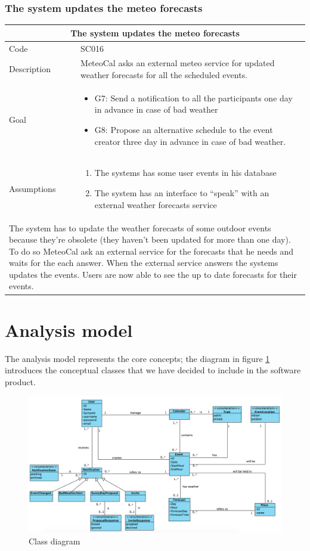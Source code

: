 \documentclass[10pt,a4paper,titlepage]{article}
\begin{document}
\subsubsection{The system updates the meteo forecasts}
\begin{tabular}{| p{3cm} | p{10cm} |}
\hline \multicolumn{2}{|c|}{\textbf{The system updates the meteo forecasts}} \\ 
\hline Code & SC016 \\ 
\hline Description & MeteoCal asks an external meteo service for updated weather forecasts for all the scheduled events. \\
\hline Goal & \begin{itemize}
\item G7: Send a notification to all the participants one day in advance in case of bad weather
\item G8: Propose an alternative schedule to the event creator three day in advance in case of bad weather.
\end{itemize}\\
\hline Assumptions  & \begin{enumerate}
\item The systems has some user events in his database
\item The system has an interface to “speak” with an external weather forecasts service
\end{enumerate} \\
\hline \multicolumn{2}{|p{13cm}|}{The system has to update the weather forecasts of some outdoor events because they’re obsolete (they haven’t been updated for more than one day). To do so MeteoCal ask an external service for the forecasts that he needs and waits for the each answer. When the external service answers the systems updates the events. Users are now  able to see the up to date forecasts for their events.}\\
\hline
\end{tabular}

\section{Analysis model}
The analysis model represents the core concepts; the diagram in figure \ref{fig:ClassDiag} introduces the conceptual classes that we have decided to include in the software product.
\begin{figure}[h]
\centering
\includegraphics[width=\linewidth]{./Uml/ClassDiagram.png}
\caption[ClassDiag]{Class diagram}
\label{fig:ClassDiag}
\end{figure}
\end{document}
